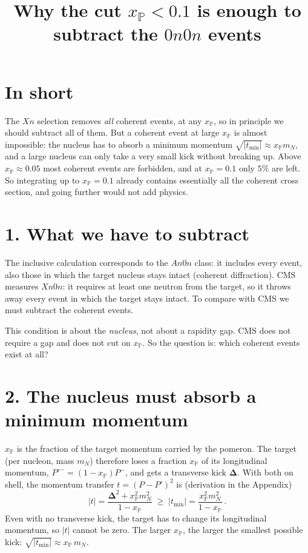 \documentclass[12pt]{article}
\title{Why the cut $x_{\mathbb P}<0.1$ is enough to subtract the $0n0n$ events}
\author{}
\date{}
\begin{document}
\maketitle

\section*{In short}

The $Xn$ selection removes \emph{all} coherent events, at any $x_{\mathbb P}$, so in principle we
should subtract all of them. But a coherent event at large $x_{\mathbb P}$ is almost impossible: the
nucleus has to absorb a minimum momentum $\sqrt{|t_{\min}|}\approx x_{\mathbb P}m_N$, and a large
nucleus can only take a very small kick without breaking up. Above $x_{\mathbb P}\approx0.05$ most
coherent events are forbidden, and at $x_{\mathbb P}=0.1$ only $5\%$ are left. So integrating up to
$x_{\mathbb P}=0.1$ already contains essentially all the coherent cross section, and going further
would not add physics.

\section*{1. What we have to subtract}

The inclusive calculation corresponds to the $An0n$ class: it includes every event, also those in
which the target nucleus stays intact (coherent diffraction). CMS measures $Xn0n$: it requires at
least one neutron from the target, so it throws away every event in which the target stays intact.
To compare with CMS we must subtract the coherent events.

This condition is about the \emph{nucleus}, not about a rapidity gap. CMS does not require a gap and
does not cut on $x_{\mathbb P}$. So the question is: which coherent events exist at all?

\section*{2. The nucleus must absorb a minimum momentum}

$x_{\mathbb P}$ is the fraction of the target momentum carried by the pomeron. The target (per
nucleon, mass $m_N$) therefore loses a fraction $x_{\mathbb P}$ of its longitudinal momentum,
$P'^-=(1-x_{\mathbb P})P^-$, and gets a transverse kick $\boldsymbol\Delta$. With both on shell,
the momentum transfer $t=(P-P')^2$ is (derivation in the Appendix)
\begin{equation}
  |t| = \frac{\boldsymbol\Delta^2 + x_{\mathbb P}^2m_N^2}{1-x_{\mathbb P}}
  \;\geq\; |t_{\min}| = \frac{x_{\mathbb P}^2m_N^2}{1-x_{\mathbb P}}\,.
\end{equation}
Even with no transverse kick, the target has to change its longitudinal momentum, so $|t|$ cannot
be zero. The larger $x_{\mathbb P}$, the larger the smallest possible kick:
$\sqrt{|t_{\min}|}\approx x_{\mathbb P}\,m_N$.
\end{document}
